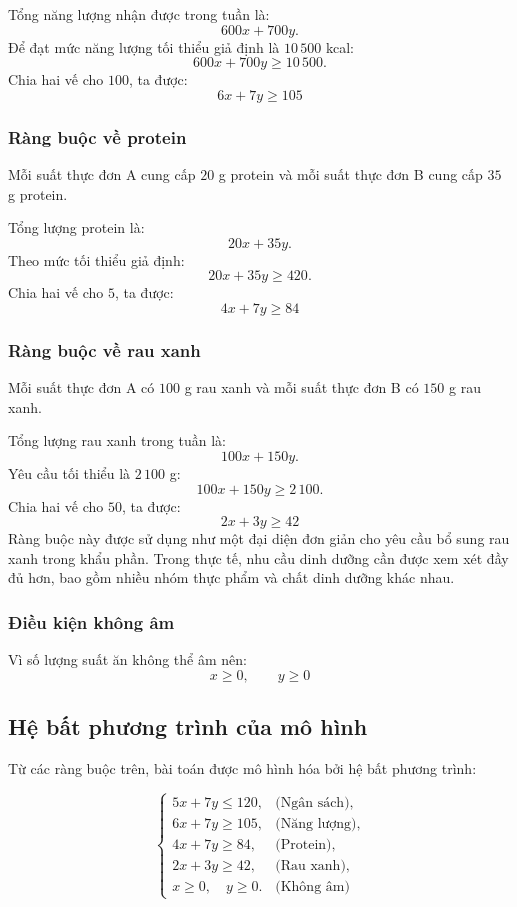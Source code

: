 \documentclass[12pt,a4paper]{article}
\begin{document}
Tổng năng lượng nhận được trong tuần là:
\[
600x+700y.
\]
Để đạt mức năng lượng tối thiểu giả định là $10\,500$ kcal:
\[
600x+700y\geq10\,500.
\]
Chia hai vế cho $100$, ta được:
\[
\boxed{
6x+7y\geq105
}
\tag{2}
\]

\subsubsection{Ràng buộc về protein}

Mỗi suất thực đơn A cung cấp $20$ g protein và mỗi suất thực đơn B cung cấp $35$ g protein.

Tổng lượng protein là:
\[
20x+35y.
\]
Theo mức tối thiểu giả định:
\[
20x+35y\geq420.
\]
Chia hai vế cho $5$, ta được:
\[
\boxed{
4x+7y\geq84
}
\tag{3}
\]

\subsubsection{Ràng buộc về rau xanh}

Mỗi suất thực đơn A có $100$ g rau xanh và mỗi suất thực đơn B có $150$ g rau xanh.

Tổng lượng rau xanh trong tuần là:
\[
100x+150y.
\]
Yêu cầu tối thiểu là $2\,100$ g:
\[
100x+150y\geq2\,100.
\]
Chia hai vế cho $50$, ta được:
\[
\boxed{
2x+3y\geq42
}
\tag{4}
\]
Ràng buộc này được sử dụng như một đại diện đơn giản cho yêu cầu bổ sung rau xanh trong khẩu phần. Trong thực tế, nhu cầu dinh dưỡng cần được xem xét đầy đủ hơn, bao gồm nhiều nhóm thực phẩm và chất dinh dưỡng khác nhau.

\subsubsection{ Điều kiện không âm}

Vì số lượng suất ăn không thể âm nên:
\[
\boxed{
x\geq0,\qquad y\geq0
}
\tag{5}
\]

\subsection{Hệ bất phương trình của mô hình}

Từ các ràng buộc trên, bài toán được mô hình hóa bởi hệ bất phương trình:

\[
\boxed{
\left\{
\begin{array}{ll}
5x+7y\leq120, & \text{(Ngân sách)},\\[4pt]
6x+7y\geq105, & \text{(Năng lượng)},\\[4pt]
4x+7y\geq84, & \text{(Protein)},\\[4pt]
2x+3y\geq42, & \text{(Rau xanh)},\\[4pt]
x\geq0,\quad y\geq0. & \text{(Không âm)}
\end{array}
\right.
}
\]
\end{document}
